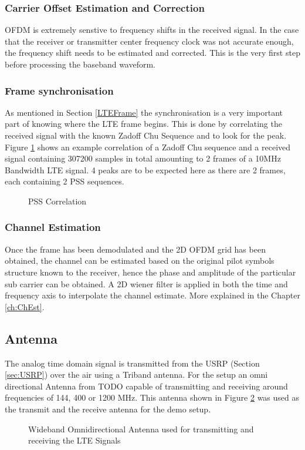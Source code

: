 \subsubsection{Carrier Offset Estimation and Correction}
OFDM is extremely senstive to frequency shifts in the received signal. In the case that the receiver or transmitter center frequency clock was not accurate enough, the frequency shift needs to be estimated and corrected. This is the very first step before processing the baseband waveform.


\subsubsection{Frame synchronisation}
As mentioned in Section \ref{LTEFrame} the synchronisation is a very important part of knowing where the LTE frame begins. This is done by correlating the received signal with the known Zadoff Chu Sequence and to look for the peak. Figure \ref{fig:PSSCorr} shows an example correlation of a Zadoff Chu sequence and a received signal containing 307200 samples in total amounting to 2 frames of a 10MHz Bandwidth LTE signal. 4 peaks are to be expected here as there are 2 frames, each containing 2 PSS sequences.

\begin{figure}[H]
    \begin{center}
        \caption{PSS Correlation}
        \label{fig:PSSCorr}
    \end{center}
\end{figure}

\subsubsection{Channel Estimation}

Once the frame has been demodulated and the 2D OFDM grid has been obtained, the channel can be estimated based on the original pilot symbols structure known to the receiver, hence the phase and amplitude of the particular sub carrier can be obtained. A 2D wiener filter is applied in both the time and frequency axis to interpolate the channel estimate. More explained in the Chapter \ref{ch:ChEst}.


\subsection{Antenna}
The analog time domain signal is transmitted from the USRP (Section \ref{sec:USRP}) over the air using a Triband antenna. For the setup an omni directional Antenna from TODO capable of transmitting and receiving around frequencies of 144, 400 or 1200 MHz. This antenna shown in Figure \ref{fig:USRPAnt} was used as the transmit and the receive antenna for the demo setup.

\begin{figure}[H]
    \begin{center}
        \caption{Wideband Omnidirectional Antenna used for transmitting and receiving the LTE Signals}
        \label{fig:USRPAnt}
    \end{center}
\end{figure}
